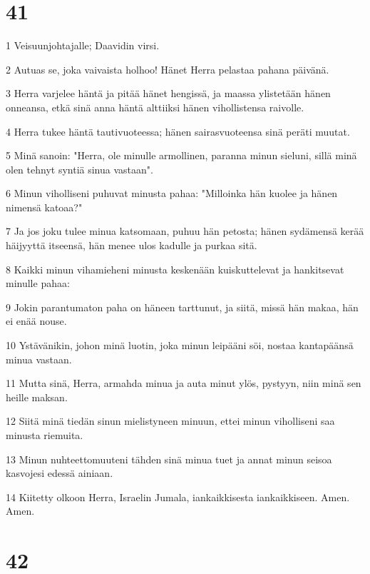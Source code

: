 \chapter{41}

\par 1 Veisuunjohtajalle; Daavidin virsi.
\par 2 Autuas se, joka vaivaista holhoo! Hänet Herra pelastaa pahana päivänä.
\par 3 Herra varjelee häntä ja pitää hänet hengissä, ja maassa ylistetään hänen onneansa, etkä sinä anna häntä alttiiksi hänen vihollistensa raivolle.
\par 4 Herra tukee häntä tautivuoteessa; hänen sairasvuoteensa sinä peräti muutat.
\par 5 Minä sanoin: "Herra, ole minulle armollinen, paranna minun sieluni, sillä minä olen tehnyt syntiä sinua vastaan".
\par 6 Minun viholliseni puhuvat minusta pahaa: "Milloinka hän kuolee ja hänen nimensä katoaa?"
\par 7 Ja jos joku tulee minua katsomaan, puhuu hän petosta; hänen sydämensä kerää häijyyttä itseensä, hän menee ulos kadulle ja purkaa sitä.
\par 8 Kaikki minun vihamieheni minusta keskenään kuiskuttelevat ja hankitsevat minulle pahaa:
\par 9 Jokin parantumaton paha on häneen tarttunut, ja siitä, missä hän makaa, hän ei enää nouse.
\par 10 Ystävänikin, johon minä luotin, joka minun leipääni söi, nostaa kantapäänsä minua vastaan.
\par 11 Mutta sinä, Herra, armahda minua ja auta minut ylös, pystyyn, niin minä sen heille maksan.
\par 12 Siitä minä tiedän sinun mielistyneen minuun, ettei minun viholliseni saa minusta riemuita.
\par 13 Minun nuhteettomuuteni tähden sinä minua tuet ja annat minun seisoa kasvojesi edessä ainiaan.
\par 14 Kiitetty olkoon Herra, Israelin Jumala, iankaikkisesta iankaikkiseen. Amen. Amen.

\chapter{42}

